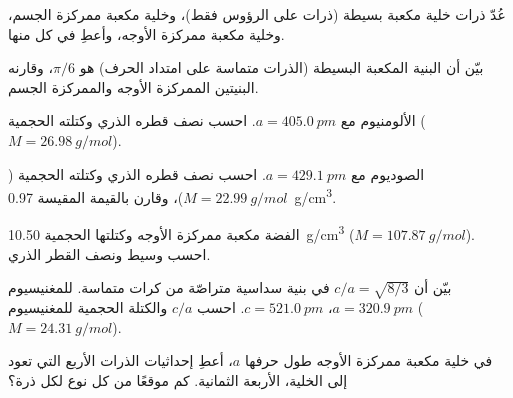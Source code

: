 \begin{exercise}[$\star$]\label{exo:b1:crystals-metals:1}
عُدّ ذرات خلية مكعبة بسيطة (ذرات على الرؤوس فقط)، وخلية
مكعبة ممركزة الجسم، وخلية مكعبة ممركزة الأوجه، وأعطِ  في كل منها.
\end{exercise}

\begin{exercise}[$\star$]\label{exo:b1:crystals-metals:2}
بيّن أن  البنية المكعبة البسيطة (الذرات متماسة
على امتداد الحرف) هو $\pi/6$، وقارنه  البنيتين الممركزة الأوجه والممركزة الجسم.
\end{exercise}

\begin{exercise}[$\star$]\label{exo:b1:crystals-metals:3}
الألومنيوم  مع $a = \qty{405.0}{pm}$. احسب نصف قطره الذري
وكتلته الحجمية ($M = \qty{26.98}{g/mol}$).
\end{exercise}

\begin{exercise}[$\star$]\label{exo:b1:crystals-metals:4}
الصوديوم  مع $a = \qty{429.1}{pm}$. احسب نصف قطره الذري
وكتلته الحجمية ($M = \qty{22.99}{g/mol}$)، وقارن بالقيمة المقيسة
\qty{0.97}{g/cm^3}.
\end{exercise}

\begin{exercise}[$\star\star$]\label{exo:b1:crystals-metals:5}
الفضة مكعبة ممركزة الأوجه وكتلتها الحجمية \qty{10.50}{g/cm^3}
($M = \qty{107.87}{g/mol}$). احسب وسيط  ونصف القطر
الذري.
\end{exercise}

\begin{exercise}[$\star\star$]\label{exo:b1:crystals-metals:6}
بيّن أن $c/a = \sqrt{8/3}$ في بنية سداسية متراصّة من كرات متماسة.
للمغنيسيوم $a = \qty{320.9}{pm}$، $c = \qty{521.0}{pm}$. احسب $c/a$
والكتلة الحجمية للمغنيسيوم ($M = \qty{24.31}{g/mol}$).
\end{exercise}

\begin{exercise}[$\star\star$]\label{exo:b1:crystals-metals:7}
في خلية مكعبة ممركزة الأوجه طول حرفها $a$، أعطِ إحداثيات الذرات الأربع التي
تعود إلى الخلية،  الأربعة 
الثمانية. كم موقعًا من كل نوع لكل ذرة؟
\end{exercise}

